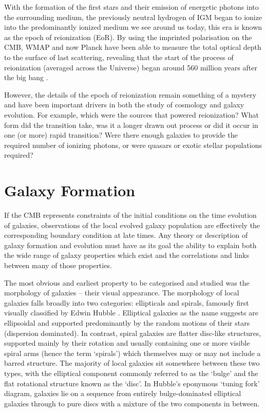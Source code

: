 With the formation of the first stars and their emission of energetic photons into the surrounding medium, the previously neutral hydrogen of IGM began to ionize into the predominantly ionized medium we see around us today, this era is known as the epoch of reionization (EoR). By using the imprinted polarisation on the CMB, WMAP and now Planck have been able to measure the total optical depth to the surface of last scattering, revealing that the start of the process of reionization (averaged across the Universe) began around 560 million years after the big bang \citep{Collaboration:2015tp}.

However, the details of the epoch of reionization remain something of a mystery and have been important drivers in both the study of cosmology and galaxy evolution. For example, which were the sources that powered reionization? What form did the transition take, was it a longer drawn out process or did it occur in one (or more) rapid transition? Were there enough galaxies to provide the required number of ionizing photons, or were quasars or exotic stellar populations required? 
 
\section{Galaxy Formation}\label{sec:intro-galform}

If the CMB represents constraints of the initial conditions on the time evolution of galaxies, observations of the local evolved galaxy population are effectively the corresponding boundary condition at late times. Any theory or description of galaxy formation and evolution must have as its goal the ability to explain both the wide range of galaxy properties which exist and the correlations and links between many of those properties.

The most obvious and earliest property to be categorised and studied was the morphology of galaxies -- their visual appearance. The morphology of local galaxies falls broadly into two categories: ellipticals and spirals, famously first visually classified by Edwin Hubble \citep{Hubble:1926be}. Elliptical galaxies as the name suggests are ellipsoidal and supported predominantly by the random motions of their stars (dispersion dominated). In contrast, spiral galaxies are flatter disc-like structures, supported mainly by their rotation and usually containing one or more visible spiral arms (hence the term `spirals') which themselves may or may not include a barred structure. The majority of local galaxies sit somewhere between these two types, with the elliptical component commonly referred to as the `bulge' and the flat rotational structure known as the `disc'. In Hubble's eponymous `tuning fork' diagram, galaxies lie on a sequence from entirely bulge-dominated elliptical galaxies through to pure discs with a mixture of the two components in between.

